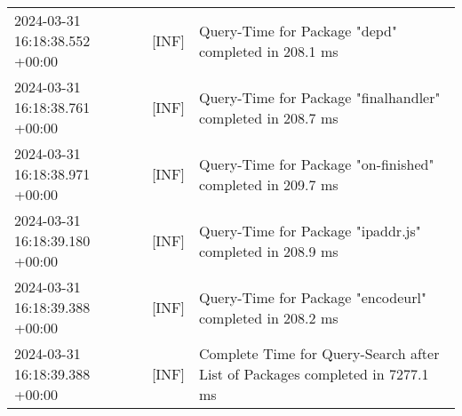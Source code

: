 {{\begin{tabularx}{\textwidth}{|l|l|X|}
                    2024-03-31 16:18:38.552 +00:00 & [INF] & Query-Time for Package "depd" completed in 208.1 ms \\
                    2024-03-31 16:18:38.761 +00:00 & [INF] & Query-Time for Package "finalhandler" completed in 208.7 ms \\
                    2024-03-31 16:18:38.971 +00:00 & [INF] & Query-Time for Package "on-finished" completed in 209.7 ms \\
                    2024-03-31 16:18:39.180 +00:00 & [INF] & Query-Time for Package "ipaddr.js" completed in 208.9 ms \\
                    2024-03-31 16:18:39.388 +00:00 & [INF] & Query-Time for Package "encodeurl" completed in 208.2 ms \\
                    2024-03-31 16:18:39.388 +00:00 & [INF] & Complete Time for Query-Search after List of Packages completed in 7277.1 ms \\
                    \hline
                \end{tabularx}
            }
        }


